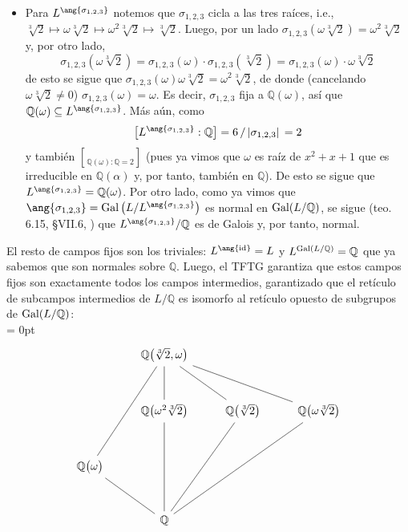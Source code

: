\begin{sol}
\begin{enumerate}[label=\alph*)]
\begin{itemize}
    \item 
    Para $L^{\ang{\sigma_{1,2,3}}}$ notemos que $\sigma_{1,2,3}$ cicla a las tres raíces, i.e., $\sqrt[3]{2} \mapsto \omega\sqrt[3]{2} \mapsto \omega^2\sqrt[3]{2} \mapsto \sqrt[3]{2}$. Luego, por un lado $\sigma_{1,2,3}(\omega\sqrt[3]{2}) = \omega^2\sqrt[3]{2}$ y, por otro lado,
    \[
    \sigma_{1,2,3}(\omega\sqrt[3]{2}) = \sigma_{1,2,3}(\omega)\cdot\sigma_{1,2,3}(\sqrt[3]{2})= \sigma_{1,2,3}(\omega)\cdot\omega\sqrt[3]{2}
    \]
    de esto se sigue que $\sigma_{1,2,3}(\omega)\omega\sqrt[3]{2} = \omega^2\sqrt[3]{2}$, de donde (cancelando $\omega\sqrt[3]{2} \neq0$) $\sigma_{1,2,3}(\omega) = \omega$. Es decir, $\sigma_{1,2,3}$ fija a $\mathbb{Q}(\omega)$, así que $\mathbb{Q}(\omega) \subseteq L^{\ang{\sigma_{1,2,3}}}$. Más aún, como
    \[
    \brack[\big]{L^{\ang{\sigma_{1,2,3}}} : \mathbb{Q}}%
    ={6}\,/\,{\abs*{\sigma_{1,2,3}}} = 2
    \]
    y también $\brack{\mathbb{Q}(\omega) : \mathbb{Q}} = 2$ (pues ya vimos que $\omega$ es raíz de $x^2+x+1$ que es irreducible en $\mathbb{Q}(\alpha)$ y, por tanto, también en $\mathbb{Q}$). De esto se sigue que $L^{\ang{\sigma_{1,2,3}}} = \mathbb{Q}(\omega)$. Por otro lado, como ya vimos que $\ang{\sigma_{1,2,3}} = \gal\big(L/L^{\ang{\sigma_{1,2,3}}}\big)$ es normal en $\operatorname{Gal}(L/\mathbb{Q})$, se sigue (teo. 6.15, \S VII.6, \cite{aluffi}) que $L^{\ang{\sigma_{1,2,3}}}/\mathbb{Q}$ es de Galois y, por tanto, normal.
\end{itemize}
El resto de campos fijos son los triviales: $L^{\ang{\id}} = L$ y $L^{\operatorname{Gal}(L/\mathbb{Q})} = \mathbb{Q}$ que ya sabemos que son normales sobre $\mathbb{Q}$. Luego, el TFTG garantiza que estos campos fijos son exactamente todos los campos intermedios, garantizado que el retículo de subcampos intermedios de $L/\mathbb{Q}$ es isomorfo al retículo opuesto de subgrupos de $\operatorname{Gal}(L/\mathbb{Q})$:\\\vspace{1em}
{\mathsurround = 0pt
\[\begin{tikzcd}[column sep = 2.5em,row sep = 3em]
	& \mathbb{Q}\big(\sqrt[3]{2},\omega\big) \\
	& {\mathbb{Q}\big(\omega^2\sqrt[3]{2}\big)} & {\mathbb{Q}\big(\sqrt[3]{2}\big)} & {\mathbb{Q}\big(\omega\sqrt[3]{2}\big)} \\
	{\mathbb{Q}\big(\omega\big)} \\
	& {\mathbb{Q}}
	\arrow[no head, from=2-2, to=1-2]
	\arrow[no head, from=2-3, to=1-2]
	\arrow[no head, from=2-4, to=1-2]
	\arrow[no head, from=3-1, to=1-2]
	\arrow[no head, from=4-2, to=2-2]
	\arrow[no head, from=4-2, to=2-3]
	\arrow[no head, from=4-2, to=2-4]
	\arrow[no head, from=4-2, to=3-1]
\end{tikzcd}\]
}
\end{enumerate}
\end{sol}

